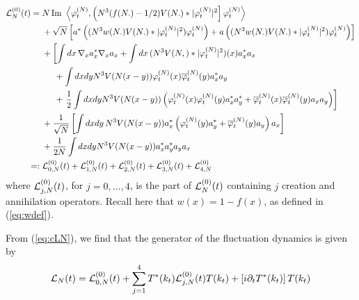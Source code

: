 \documentclass[11pt,a4paper,DIV11]{scrartcl}	%
\newcommand{\cL}{{\cal L}}
\begin{document}
\[ \begin{split} \cL_N^{(0)} (t) = \; & N \, \text{Im } \left\langle \varphi_t^{(N)} , \left(N^3 (f(N.) - 1/2) V(N.) * |\varphi_t^{(N)}|^2 \right] \varphi_t^{(N)} \right\rangle \\ &+ \sqrt{N}  \left[  a^*\left( (N^3 w(N.) V (N.) *| \varphi_t^{(N)}|^2) \varphi_t^{(N)} \right) + a\left( (N^3 w (N.)V (N.) *| \varphi_t^{(N)}|^2) \varphi_t^{(N)} \right) \right] \\
&+ \left[ \int dx \, \nabla_x a_x^* \nabla_x a_x + \int dx \, (N^3 V (N,) * |\varphi_t^{(N)}|^2) (x) a_x^* a_x \right. \\ 
&\hspace{.5cm}+ \int dx dy N^3 V(N (x-y)) \varphi_t^{(N)} (x) \overline{\varphi}_t^{(N)} (y) a_x^* a_y \\
&\hspace{.5cm}+ \left.  \frac{1}{2} \int dx dy N^3 V(N (x-y)) \left( \varphi_t^{(N)} (x) \varphi_t^{(N)} (y) a_x^* a_y^* + 
\overline{\varphi}_t^{(N)} (x) \overline{\varphi}_t^{(N)} (y) a_x a_y \right) \right] \\
&+ \frac{1}{\sqrt{N}} \left[  \int dx dy \, N^3 V(N(x-y)) a_x^* \left( \varphi_t^{(N)} (y) a_y^* + \overline{\varphi}_t^{(N)} (y) a_y \right) a_x \right] \\
&+\frac{1}{2N} \int dx dy N^3 V(N (x-y)) a_x^* a_y^* a_y a_x \\
=: \; & \cL_{0,N}^{(0)} (t) + \cL_{1,N}^{(0)} (t) + \cL_{2,N}^{(0)} (t) +  
\cL_{3,N}^{(0)} (t) + \cL_{4,N}^{(0)} 
\end{split} \]
where $\cL^{(0)}_{j,N} (t)$, for $j=0, \dots , 4$, is the part of $\cL_N^{(0)} (t)$ containing $j$ creation and annihilation operators. Recall here that $w (x) = 1 - f (x)$, as defined in (\ref{eq:wdef}). 

{F}rom (\ref{eq:cLN}), we find that the generator of the fluctuation dynamics is given by
\begin{equation}\label{eq:dec-cLN} \cL_N (t) =  \cL_{0,N}^{(0)} (t) + \sum_{j=1}^4 T^* (k_t) \cL_{j,N}^{(0)} (t) T (k_t) +\left[ i \partial_t T^* (k_t) \right] T(k_t) \end{equation}
\end{document}
